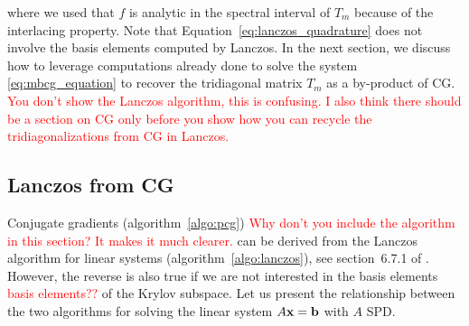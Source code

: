 \documentclass{article}
\begin{document}
{where we used that $f$ is analytic in the spectral interval of $T_m$ because of the interlacing property. 
%
%
Note that Equation~\ref{eq:lanczos_quadrature} does not involve the basis elements computed by Lanczos. In the next section, we discuss how to leverage computations already done to solve the system \eqref{eq:mbcg_equation} to recover the tridiagonal matrix $T_m$ as a by-product of CG. \textcolor{red}{You don't show the Lanczos algorithm, this is confusing. I also think there should be a section on CG only before you show how you can recycle the tridiagonalizations from CG in Lanczos. }


\subsection{Lanczos from CG} \label{sec:lanczos_from_cg}

Conjugate gradients (algorithm~\ref{algo:pcg}) \textcolor{red}{Why don't you include the algorithm in this section? It makes it much clearer.} can be derived from the Lanczos algorithm for linear systems (algorithm~\ref{algo:lanczos}), see section~6.7.1 of \cite{saad_iterative_2003}. However, the reverse is also true if we are not interested in the basis elements \textcolor{red}{basis elements??} of the Krylov subspace. Let us present the relationship between the two algorithms for solving the linear system $A \boldsymbol{\mathbf{x}} = \boldsymbol{\mathbf{b}}$ with $A$ SPD. 

}
\end{document}
